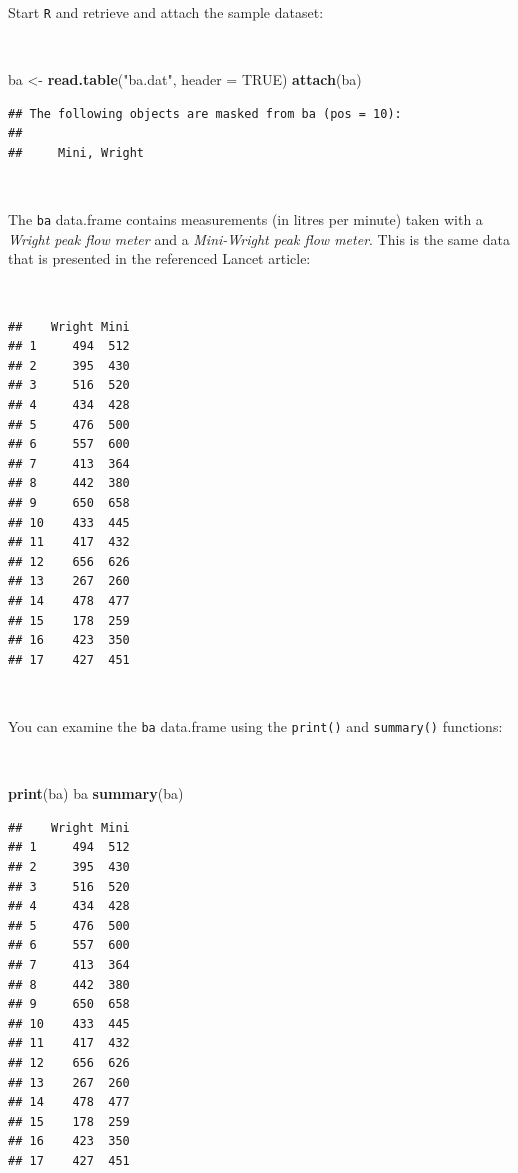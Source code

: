 \documentclass[12pt,a4paper]{book}
\newenvironment{Shaded}{\begin{snugshade}}{\end{snugshade}}
\newcommand{\DataTypeTok}[1]{\textcolor[rgb]{0.13,0.29,0.53}{#1}}
\newcommand{\KeywordTok}[1]{\textcolor[rgb]{0.13,0.29,0.53}{\textbf{#1}}}
\newcommand{\NormalTok}[1]{#1}
\newcommand{\OtherTok}[1]{\textcolor[rgb]{0.56,0.35,0.01}{#1}}
\newcommand{\StringTok}[1]{\textcolor[rgb]{0.31,0.60,0.02}{#1}}
\theoremstyle{definition}
\theoremstyle{definition}
\theoremstyle{definition}
\theoremstyle{remark}
\begin{document}
Start \texttt{R} and retrieve and attach the sample dataset:

~

\begin{Shaded}
\begin{Highlighting}[]
\NormalTok{ba <-}\StringTok{ }\KeywordTok{read.table}\NormalTok{(}\StringTok{"ba.dat"}\NormalTok{, }\DataTypeTok{header =} \OtherTok{TRUE}\NormalTok{)}
\KeywordTok{attach}\NormalTok{(ba)}
\end{Highlighting}
\end{Shaded}

\begin{verbatim}
## The following objects are masked from ba (pos = 10):
## 
##     Mini, Wright
\end{verbatim}

~

The \texttt{ba} data.frame contains measurements (in litres per minute)
taken with a \emph{Wright peak flow meter} and a \emph{Mini-Wright peak
flow meter}. This is the same data that is presented in the referenced
Lancet article:

~

\begin{verbatim}
##    Wright Mini
## 1     494  512
## 2     395  430
## 3     516  520
## 4     434  428
## 5     476  500
## 6     557  600
## 7     413  364
## 8     442  380
## 9     650  658
## 10    433  445
## 11    417  432
## 12    656  626
## 13    267  260
## 14    478  477
## 15    178  259
## 16    423  350
## 17    427  451
\end{verbatim}

~

You can examine the \texttt{ba} data.frame using the \texttt{print()}
and \texttt{summary()} functions:

~

\begin{Shaded}
\begin{Highlighting}[]
\KeywordTok{print}\NormalTok{(ba)}
\NormalTok{ba}
\KeywordTok{summary}\NormalTok{(ba)}
\end{Highlighting}
\end{Shaded}

\begin{verbatim}
##    Wright Mini
## 1     494  512
## 2     395  430
## 3     516  520
## 4     434  428
## 5     476  500
## 6     557  600
## 7     413  364
## 8     442  380
## 9     650  658
## 10    433  445
## 11    417  432
## 12    656  626
## 13    267  260
## 14    478  477
## 15    178  259
## 16    423  350
## 17    427  451
\end{verbatim}
\end{document}
